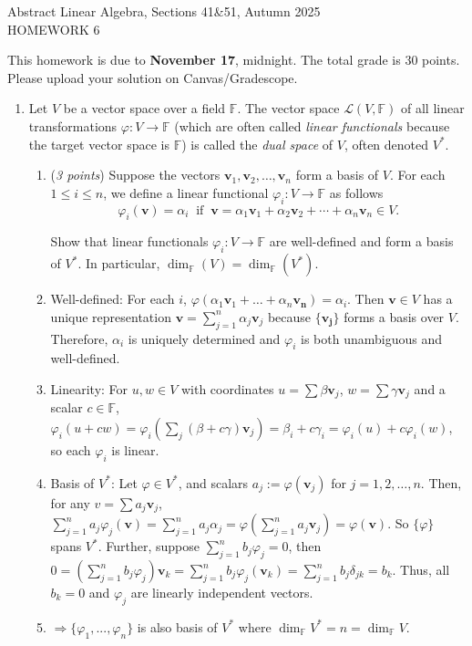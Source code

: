 \documentclass[11pt]{article}
\newcommand{\bbF}{\mathbb{F}}
\renewcommand{\phi}{\varphi}
\newcommand{\head}[1]{
	\begin{center}
		{\large #1}
		\vspace{.2 in}
	\end{center}
	
	\bigskip 
}
\theoremstyle{definition}
\numberwithin{equation}{subsection}
\begin{document}
\pagestyle{plain}


\setcounter{section}{1}   

\head{Abstract Linear Algebra, Sections 41\&51, Autumn 2025\\ HOMEWORK 6} 

This homework is due to {\bf November 17}, midnight. The total grade is 30 points. Please upload your solution on Canvas/Gradescope.

\begin{enumerate}

\item Let $V$ be a vector space over a field $\mathbb{F}$. The vector space $\mathcal{L}(V,\mathbb{F})$ of all linear transformations $\varphi\colon V\to\mathbb{F}$ (which are often called \emph{linear functionals} because the target vector space is $\mathbb{F}$) is called the \emph{dual space} of $V$, often denoted $V^*$. 

\begin{enumerate} 

\item(\emph{3 points}) Suppose the vectors $\mathbf{v}_1, \mathbf{v}_2, \dots, \mathbf{v}_n$ form a basis of $V$. For each $1 \leq i\leq n$, we define a linear functional $\phi_i \colon V \to \bbF$ as follows $$\phi_i(\mathbf{v})=\alpha_i \;\; \text{if} \;\; \mathbf{v}=\alpha_1\mathbf{v}_1+\alpha_2\mathbf{v}_2+\cdots+\alpha_n\mathbf{v}_n\in V.$$

Show that linear functionals $\phi_i\colon V \to \bbF$ are well-defined and form a basis of $V^*$. In particular, $\dim_\bbF(V) =\dim_{\bbF}(V^*)$.
\item[] Well-defined: For each $i$, $\varphi(\alpha_1\mathbf{v}_1+\ldots+\alpha _n\mathbf{v_n})=\alpha_i$. Then $\mathbf{v}\in V$ has a unique representation $\mathbf{v}=\sum_{j=1}^n\alpha _j\mathbf{v}_j$ because $\{\mathbf{v_j}\}$ forms a basis over $V$. Therefore, $\alpha_i$ is uniquely determined and $\varphi_i$ is both unambiguous and well-defined.
\item[] Linearity: For $u,w\in V$ with coordinates $u=\sum\beta \mathbf{v}_j$, $w=\sum\gamma \mathbf{v}_j$ and a scalar $c\in\bbF$, $\varphi_i(u+cw)=\varphi_i(\sum_j(\beta +c\gamma)\mathbf{v}_j)=\beta_i+c\gamma_i=\varphi_i(u)+c\varphi_i(w)$, so each $\varphi_i$ is linear.
\item[] Basis of $V^*$: Let $\varphi\in V^*$, and scalars $a_j:=\varphi(\mathbf{v}_j)$ for $j=1,2,\ldots,n$. Then, for any $v=\sum a_j\mathbf{v}_j$, $\sum_{j=1}^na_j\varphi_j(\mathbf{v})=\sum_{j=1}^na_j\alpha_j=\varphi(\sum_{j=1}^na_j\mathbf{v}_j)=\varphi(\mathbf{v})$. So $\{\varphi\}$ spans $V^*$. Further, suppose $\sum_{j=1}^nb_j\varphi_j=0$, then $0=(\sum_{j=1}^nb_j\varphi_j)\mathbf{v}_k=\sum_{j=1}^nb_j\varphi_j(\mathbf{v}_k)=\sum_{j=1}^nb_j\delta_{jk}=b_k$. Thus, all $b_k=0$ and $\varphi_j$ are linearly independent vectors.
\item[] $\Rightarrow \{\varphi_1,...,\varphi_n\}$ is also basis of $V^*$ where $\dim_\bbF V^*=n=\dim_\bbF V$.


\end{enumerate}
\end{enumerate}
\end{document}
